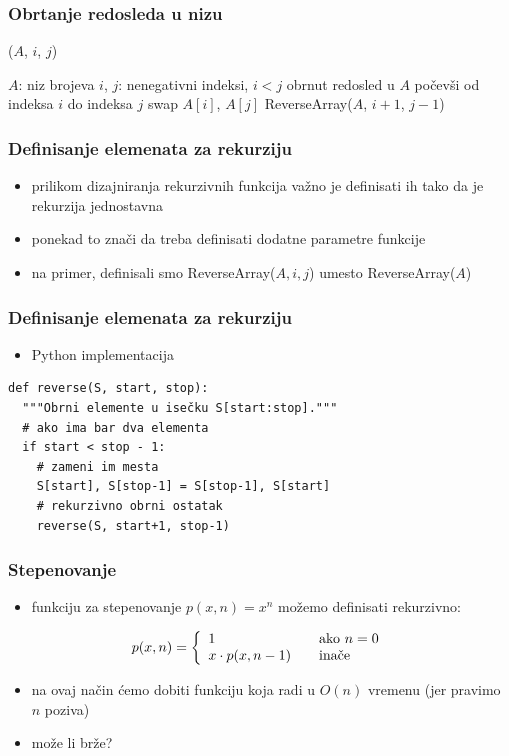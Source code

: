 \documentclass[compress]{beamer}
\begin{document}
\begin{frame}[fragile]
  \frametitle{Obrtanje redosleda u nizu}
($A$, $i$, $j$)
\begin{algorithmic}
\REQUIRE $A$: niz brojeva
\REQUIRE $i$, $j$: nenegativni indeksi, $i<j$
\ENSURE obrnut redosled u $A$ počevši od indeksa $i$ do indeksa $j$
  \STATE swap $A[i]$, $A[j]$
  \STATE ReverseArray($A$, $i+1$, $j-1$)
\ENDIF
\end{algorithmic}
\end{frame}
\begin{frame}[fragile]
  \frametitle{Definisanje elemenata za rekurziju}
  \begin{itemize}
    \item prilikom dizajniranja rekurzivnih funkcija važno je definisati ih tako da je rekurzija jednostavna
    \item ponekad to znači da treba definisati dodatne parametre funkcije
    \item na primer, definisali smo ReverseArray($A, i, j$) umesto ReverseArray($A$)
  \end{itemize}
\end{frame}
\begin{frame}[fragile]
  \frametitle{Definisanje elemenata za rekurziju}
  \begin{itemize}
    \item Python implementacija
  \end{itemize}
\begin{verbatim}
def reverse(S, start, stop):
  """Obrni elemente u isečku S[start:stop]."""
  # ako ima bar dva elementa
  if start < stop - 1:
    # zameni im mesta
    S[start], S[stop-1] = S[stop-1], S[start]
    # rekurzivno obrni ostatak
    reverse(S, start+1, stop-1)               
\end{verbatim}
\end{frame}

\begin{frame}[fragile]
  \frametitle{Stepenovanje}
  \begin{itemize}
    \item funkciju za stepenovanje $p(x,n) = x^n$ možemo definisati rekurzivno:
  \end{itemize}
  $$ p(x,n) = \left\{ \begin{array}{l l} 1 & \quad \text{ako $n=0$} \\x\cdot p(x, n-1) & \quad \text{inače}\end{array}\right. $$
  \begin{itemize}
    \item na ovaj način ćemo dobiti funkciju koja radi u $O(n)$ vremenu (jer pravimo $n$ poziva)
    \item može li brže?
  \end{itemize}
\end{frame}
\end{document}
